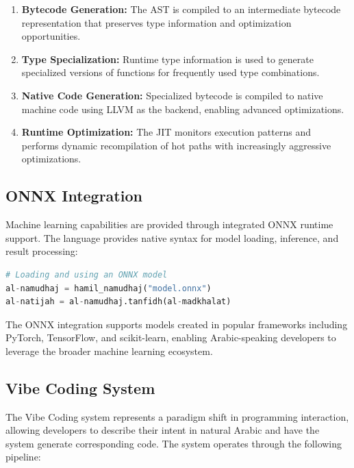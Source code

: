 \documentclass[11pt,a4paper]{article}
\begin{document}
\begin{enumerate}
    \item \textbf{Bytecode Generation:} The AST is compiled to an intermediate bytecode representation that preserves type information and optimization opportunities.
    
    \item \textbf{Type Specialization:} Runtime type information is used to generate specialized versions of functions for frequently used type combinations.
    
    \item \textbf{Native Code Generation:} Specialized bytecode is compiled to native machine code using LLVM as the backend, enabling advanced optimizations.
    
    \item \textbf{Runtime Optimization:} The JIT monitors execution patterns and performs dynamic recompilation of hot paths with increasingly aggressive optimizations.
\end{enumerate}

\subsection{ONNX Integration}

Machine learning capabilities are provided through integrated ONNX runtime support. The language provides native syntax for model loading, inference, and result processing:

\begin{lstlisting}[language=Python, caption=ONNX Integration Example]
# Loading and using an ONNX model
al-namudhaj = hamil_namudhaj("model.onnx")
al-natijah = al-namudhaj.tanfidh(al-madkhalat)
\end{lstlisting}

The ONNX integration supports models created in popular frameworks including PyTorch, TensorFlow, and scikit-learn, enabling Arabic-speaking developers to leverage the broader machine learning ecosystem.

\subsection{Vibe Coding System}

The Vibe Coding system represents a paradigm shift in programming interaction, allowing developers to describe their intent in natural Arabic and have the system generate corresponding code. The system operates through the following pipeline:
\end{document}
